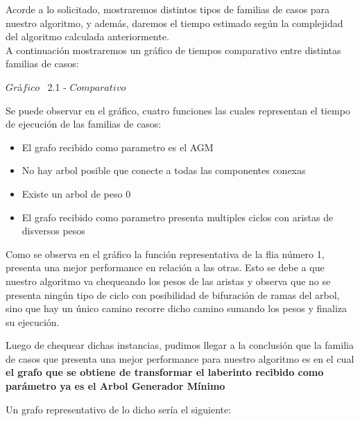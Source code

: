 \indent Acorde a lo solicitado, mostraremos distintos tipos de familias de casos para nuestro algoritmo, y adem\'as, daremos el tiempo estimado 
seg\'un la complejidad del algoritmo calculada anteriormente.\\

A continuaci\'on mostraremos un gr\'afico de tiempos comparativo entre distintas familias de casos:\\ 

\vspace*{0.3cm} \vspace*{0.3cm}
  \begin{center}
 {$Gr$\'a$fico$ \ 2.1 - $Comparativo$}
  \end{center}
  \vspace*{0.3cm}
  
Se puede observar en el gr\'afico, cuatro funciones las cuales representan el tiempo de ejecuci\'on de las familias de casos:\\
\begin{itemize}
\item El grafo recibido como parametro es el AGM
\item No hay arbol posible que conecte a todas las componentes conexas
\item Existe un arbol de peso 0
\item El grafo recibido como parametro presenta multiples ciclos con aristas de disversos pesos
\end{itemize}

Como se observa en el gr\'afico la funci\'on representativa de la flia n\'umero 1, presenta una mejor performance en relaci\'on a las otras. Esto se debe a que nuestro algoritmo va chequeando los pesos de las aristas y observa que no se presenta ning\'un tipo de ciclo con posibilidad de bifuraci\'on de ramas del arbol, sino que hay un \'unico camino recorre dicho camino sumando los pesos y finaliza su ejecuci\'on.

Luego de chequear dichas instancias, pudimos llegar a la conclusi\'on que la familia de casos que presenta una mejor performance para nuestro algoritmo
es en el cual \textbf{el grafo que se obtiene de transformar el laberinto recibido como par\'ametro ya es el Arbol Generador M\'inimo}

Un grafo representativo de lo dicho ser\'ia el siguiente:

